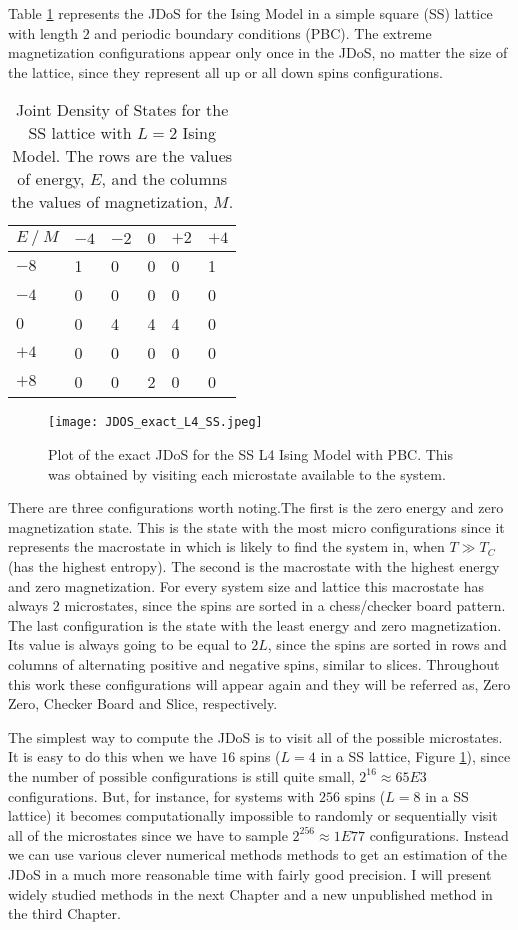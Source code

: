 Table \ref{exact_L2} represents the JDoS for the Ising Model in a simple square (SS) lattice with length $2$ and periodic boundary conditions (PBC). The extreme magnetization configurations appear only once in the JDoS, no matter the size of the lattice, since they represent all up or all down spins configurations. 

\begin{table}[h]
\centering
\caption{Joint Density of States for the SS lattice with $L=2$ Ising Model. The rows are the values of energy, $E$, and the columns the values of magnetization, $M$.}
\label{exact_L2}
\begin{tabular}{l|lllll}
$E \ / \ M$ & $-4$ & $-2$ &  $0$ & $+2$ &  $+4$ \\ \hline
$-8$  & 1  & 0  & 0 & 0 & 1 \\
$-4$  & 0  & 0  & 0 & 0 & 0 \\
$0$   & 0  & 4  & 4 & 4 & 0 \\
$+4$   & 0  & 0  & 0 & 0 & 0 \\
$+8$   & 0  & 0  & 2 & 0 & 0
\end{tabular}
\end{table}

\begin{figure}[h]
	\centering
	\texttt{[image: JDOS\_exact\_L4\_SS.jpeg]}
	\caption{Plot of the exact JDoS for the SS L4 Ising Model with PBC. This was obtained by visiting each microstate available to the system.}
	\label{exact_L4}
\end{figure}

\pagebreak

There are three configurations worth noting.The first is the zero energy and zero magnetization state. This is the state with the most micro configurations since it represents the macrostate in which is likely to find the system in, when $T\gg T_C$(has the highest entropy). The second is the macrostate with the highest energy and zero magnetization. For every system size and lattice this macrostate has always $2$ microstates, since the spins are sorted in a chess/checker board pattern. The last configuration is the state with the least energy and zero magnetization. Its value is always going to be equal to $2L$, since the spins are sorted in rows and columns of alternating positive and negative spins, similar to slices. Throughout this work these configurations will appear again and they will be referred as, Zero Zero, Checker Board and Slice, respectively. 

The simplest way to compute the JDoS is to visit all of the possible microstates. It is easy to do this when we have $16$ spins ($L=4$ in a SS lattice, Figure \ref{exact_L4}), since the number of possible configurations is still quite small, $2^{16} \approx 65E3$ configurations. But, for instance, for systems with $256$ spins ($L=8$ in a SS lattice) it becomes computationally impossible to randomly or sequentially visit all of the microstates since we have to sample $2^{256} \approx	 1E77$ configurations. 
Instead we can use various clever numerical methods methods to get an estimation of the JDoS in a much more reasonable time with fairly good precision. I will present widely studied methods in the next Chapter and a new unpublished method in the third Chapter.

